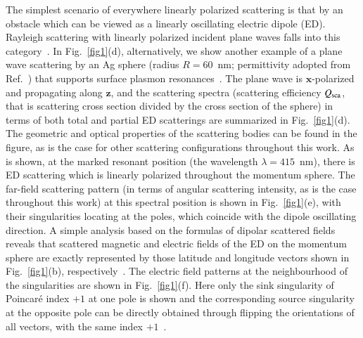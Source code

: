\documentclass[aps,twocolumn,superscriptaddress]{revtex4-1}
\newcounter{Fig}
\begin{document}
The simplest scenario of everywhere linearly polarized scattering is that by an obstacle which can be viewed as a linearly oscillating electric dipole (ED). Rayleigh scattering with linearly polarized incident plane waves falls into this category~\cite{Bohren1983_book}.  In  Fig.~\ref{fig1}(d), alternatively, we show another example of a plane wave scattering by an Ag sphere (radius $R=60$~nm; permittivity adopted from Ref.~\cite{Johnson1972_PRB}) that supports surface plasmon resonances~\cite{Maier2007}. The plane wave is $\textbf{x}$-polarized and propagating along $\textbf{z}$, and the scattering spectra (scattering efficiency $Q_{\rm sca}$, that is scattering cross section divided by the cross section of the sphere) in terms of both total and partial ED scatterings are summarized in Fig.~\ref{fig1}(d). The geometric and optical properties of the scattering bodies can be found in the figure, as is the case for other scattering configurations throughout this work. As is shown, at the marked resonant position (the wavelength $\lambda=415$~nm), there is ED scattering which is linearly polarized throughout the momentum sphere. The far-field scattering pattern  (in terms of angular scattering intensity, as is the case throughout this work) at this spectral position is shown in Fig.~\ref{fig1}(e), with their singularities locating at the poles, which coincide with the dipole oscillating direction. A simple analysis based on the formulas of dipolar scattered fields reveals that scattered magnetic and electric fields of the ED on the momentum sphere are exactly represented by those latitude and longitude vectors shown in Fig.~\ref{fig1}(b), respectively~\cite{jackson1962classical}. The electric field patterns at the neighbourhood of the singularities are shown in Fig.~\ref{fig1}(f). Here only the sink singularity of Poincar\'{e} index $+1$ at one pole is shown and the corresponding source singularity at the opposite pole can be directly obtained through flipping the orientations of all vectors, with the same index $+1$~\cite{NEEDHAM_1998__Visual}.
\end{document}
